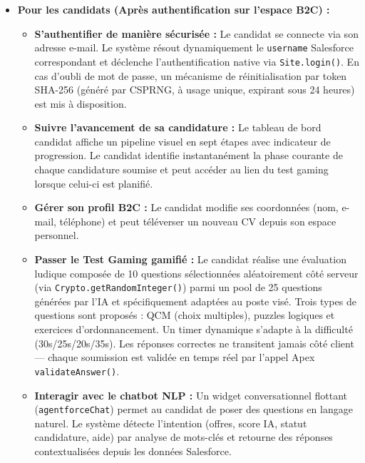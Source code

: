 \begin{itemize}
\item \textbf{Pour les candidats (Après authentification sur l'espace B2C) :}
\begin{itemize}
    \item \textbf{S'authentifier de manière sécurisée :} Le candidat se connecte via son adresse e-mail. Le système résout dynamiquement le \texttt{username} Salesforce correspondant et déclenche l'authentification native via \texttt{Site.login()}. En cas d'oubli de mot de passe, un mécanisme de réinitialisation par token SHA-256 (généré par CSPRNG, à usage unique, expirant sous 24 heures) est mis à disposition.
    \item \textbf{Suivre l'avancement de sa candidature :} Le tableau de bord candidat affiche un pipeline visuel en sept étapes avec indicateur de progression. Le candidat identifie instantanément la phase courante de chaque candidature soumise et peut accéder au lien du test gaming lorsque celui-ci est planifié.
    \item \textbf{Gérer son profil B2C :} Le candidat modifie ses coordonnées (nom, e-mail, téléphone) et peut téléverser un nouveau CV depuis son espace personnel.
    \item \textbf{Passer le Test Gaming gamifié :} Le candidat réalise une évaluation ludique composée de 10 questions sélectionnées aléatoirement côté serveur (via \texttt{Crypto.getRandomInteger()}) parmi un pool de 25 questions générées par l'IA et spécifiquement adaptées au poste visé. Trois types de questions sont proposés : QCM (choix multiples), puzzles logiques et exercices d'ordonnancement. Un timer dynamique s'adapte à la difficulté (30s/25s/20s/35s). Les réponses correctes ne transitent jamais côté client — chaque soumission est validée en temps réel par l'appel Apex \texttt{validateAnswer()}.
    \item \textbf{Interagir avec le chatbot NLP :} Un widget conversationnel flottant (\texttt{agentforceChat}) permet au candidat de poser des questions en langage naturel. Le système détecte l'intention (offres, score IA, statut candidature, aide) par analyse de mots-clés et retourne des réponses contextualisées depuis les données Salesforce.
\end{itemize}


\end{itemize}
